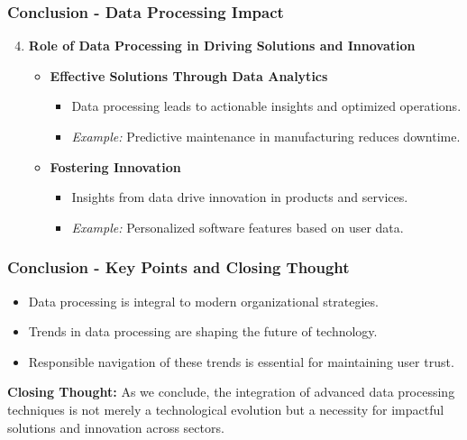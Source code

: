 \documentclass[aspectratio=169]{beamer}
\begin{document}
\begin{frame}[fragile]
    \frametitle{Conclusion - Data Processing Impact}
    \begin{enumerate}
        \setcounter{enumi}{3}
        \item \textbf{Role of Data Processing in Driving Solutions and Innovation}
        \begin{itemize}
            \item \textbf{Effective Solutions Through Data Analytics}
            \begin{itemize}
                \item Data processing leads to actionable insights and optimized operations.
                \item \textit{Example:} Predictive maintenance in manufacturing reduces downtime.
            \end{itemize}
            \item \textbf{Fostering Innovation}
            \begin{itemize}
                \item Insights from data drive innovation in products and services.
                \item \textit{Example:} Personalized software features based on user data.
            \end{itemize}
        \end{itemize}
    \end{enumerate}
\end{frame}

\begin{frame}[fragile]
    \frametitle{Conclusion - Key Points and Closing Thought}
    \begin{itemize}
        \item Data processing is integral to modern organizational strategies.
        \item Trends in data processing are shaping the future of technology.
        \item Responsible navigation of these trends is essential for maintaining user trust.
    \end{itemize}

    \textbf{Closing Thought:} 
    As we conclude, the integration of advanced data processing techniques is not merely a technological evolution but a necessity for impactful solutions and innovation across sectors.
\end{frame}
\end{document}
